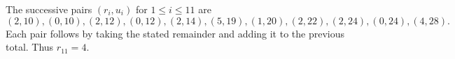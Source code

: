 The successive pairs $(r_i,u_i)$ for $1\le i\le 11$ are\[(2,10),(0,10),(2,12),(0,12),(2,14),(5,19),(1,20),(2,22),(2,24),(0,24),(4,28).\]Each pair follows by taking the stated remainder and adding it to the previous total. Thus $\boxed{r_{11}=4}$.
